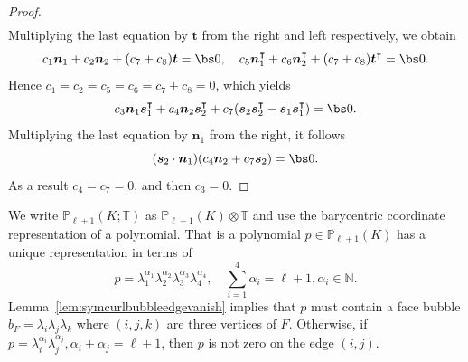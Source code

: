 \begin{proof}
\begin{align*}
\end{align*}
Multiplying the last equation by $\boldsymbol t$ from the right and left respectively, we obtain
$$
c_1\boldsymbol n_1 + c_2\boldsymbol n_2 + (c_7+c_8)\boldsymbol t=\bs0, \quad c_5\boldsymbol n_1^{\intercal} + c_6\boldsymbol n_2^{\intercal} + (c_7+c_8)\boldsymbol t^{\intercal}=\bs0.
$$
Hence $c_1=c_2=c_5=c_6=c_7+c_8=0$, which yields
$$
c_3\boldsymbol n_1\boldsymbol s_1^{\intercal} + c_4\boldsymbol n_2\boldsymbol s_2^{\intercal} + c_7(\boldsymbol s_2\boldsymbol s_2^{\intercal}-\boldsymbol s_1\boldsymbol s_1^{\intercal})=\bs0.
$$
Multiplying the last equation by $\boldsymbol n_1$ from the right, it follows
$$
(\boldsymbol s_2\cdot\boldsymbol n_1)(c_4\boldsymbol n_2 + c_7\boldsymbol s_2)=\bs0.
$$
As a result $c_4=c_7=0$, and then $c_3=0$.
\end{proof}

We write $\mathbb P_{\ell+1}(K;\mathbb T)$ as $\mathbb P_{\ell+1}(K)\otimes \mathbb T$ and use the barycentric coordinate representation of a polynomial. That is a polynomial $p\in \mathbb P_{\ell+1}(K)$ has a unique representation in terms of
\begin{equation}\label{eq:bary}
 p = \lambda_{1}^{\alpha_1}\lambda_{2}^{\alpha_2}\lambda_{3}^{\alpha_3}\lambda_{4}^{\alpha_4}, \quad \sum_{i=1}^4\alpha_i = \ell+1, \alpha_i \in \mathbb N.
\end{equation}
Lemma~\ref{lem:symcurlbubbleedgevanish} implies that $p$ must contain a face bubble $b_F = \lambda_{i}\lambda_{j}\lambda_{k}$ where $(i,j,k)$ are three vertices of $F$. Otherwise, if $p = \lambda_i^{\alpha_i}\lambda_j^{\alpha_j}, \alpha_i + \alpha_j = \ell+1$, then $p$ is not zero on the edge $(i,j)$. 

